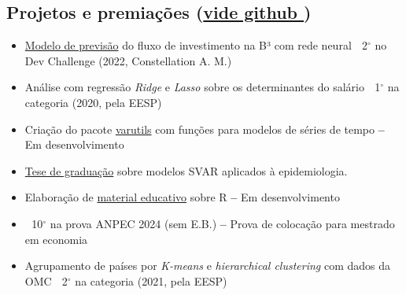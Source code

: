 \documentclass[10pt,letterpaper]{article}
\begin{document}
\subsection*{Projetos e premiações \small(\href{https://github.com/ricardo-semiao}{vide github \textmd{\faGithub}})\normalsize }
\begin{minipage}[t]{.47\textwidth}
    \begin{itemize}
        \item \href{https://github.com/ricardo-semiao/challenge-constdev}{Modelo de previsão} do fluxo de investimento na B³ com rede neural\newline
        \small \faTrophy$\;$ 2$^{\circ}$ no Dev Challenge (2022, Constellation A. M.)\normalsize

        \item Análise com regressão \textit{Ridge} e \textit{Lasso} sobre os determinantes do salário\newline
        \small \faTrophy$\;$ 1$^{\circ}$ na categoria (2020, pela EESP)\normalsize

        \item Criação do pacote \href{https://ricardo-semiao.github.io/varutils/}{varutils} com funções para modelos de séries de tempo\newline
        \small \textbf{--} Em desenvolvimento \normalsize
    \end{itemize}
\end{minipage}
\hfill
\begin{minipage}[t]{.47\textwidth}
    \begin{itemize}
        \item \href{https://github.com/ricardo-semiao/article-covid-svardiff}{Tese de graduação} sobre modelos SVAR aplicados à epidemiologia.

        \item Elaboração de \href{https://ricardo-semiao.github.io/course-r/}{material educativo} sobre R\newline
        \small \textbf{--} Em desenvolvimento \normalsize

        \item \faTrophy$\;$ 10$^{\circ}$ na prova ANPEC 2024 (sem E.B.)\newline
        \small \textbf{--} Prova de colocação para mestrado em economia\normalsize

        \item Agrupamento de países por \textit{K-means} e \textit{hierarchical clustering} com dados da OMC\newline
        \small \faTrophy$\;$ 2$^{\circ}$ na categoria (2021, pela EESP)\normalsize
    \end{itemize}
\end{minipage}
\end{document}
